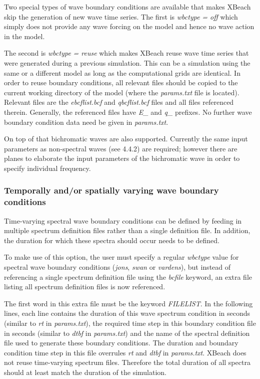 \documentclass{article}
\begin{document}
\noindent Two special types of wave boundary conditions are available that makes XBeach skip the generation of new wave time series. The first is \textit{wbctype} \textit{= off} which simply does not provide any wave forcing on the model and hence no wave action in the model.

\noindent The second is \textit{wbctype} \textit{= reuse} which makes XBeach reuse wave time series that were generated during a previous simulation. This can be a simulation using the same or a different model as long as the computational grids are identical. In order to reuse boundary conditions, all relevant files should be copied to the current working directory of the model (where the \textit{params.txt }file is located). Relevant files are the \textit{ebcflist.bcf} and \textit{qbcflist.bcf} files and all files referenced therein. Generally, the referenced files have \textit{E\_} and \textit{q\_} prefixes. No further wave boundary condition data need be given in \textit{params.txt}.

\noindent On top of that bichromatic waves are also supported. Currently the same input parameters as non-spectral waves (see 4.4.2) are required; however there are planes to elaborate the input parameters of the bichromatic wave in order to specify individual frequency.


\subsubsection{ Temporally and/or spatially varying wave boundary conditions}

\noindent Time-varying spectral wave boundary conditions can be defined by feeding in multiple spectrum definition files rather than a single definition file. In addition, the duration for which these spectra should occur needs to be defined.

\noindent To make use of this option, the user must specify a regular \textit{wbctype} value for spectral wave boundary conditions (\textit{jons}, \textit{swan} or \textit{vardens}), but instead of referencing a single spectrum definition file using the \textit{bcfile} keyword, an extra file listing all spectrum definition files is now referenced.

\noindent The first word in this extra file must be the keyword \textit{FILELIST}. In the following lines, each line contains the duration of this wave spectrum condition in seconds (similar to \textit{rt} in \textit{params.txt}), the required time step in this boundary condition file in seconds (similar to \textit{dtbf} in \textit{params.txt}) and the name of the spectral definition file used to generate these boundary conditions. The duration and boundary condition time step in this file overrules \textit{rt} and \textit{dtbf} in \textit{params.txt}. XBeach does not reuse time-varying spectrum files. Therefore the total duration of all spectra should at least match the duration of the simulation.
\end{document}
